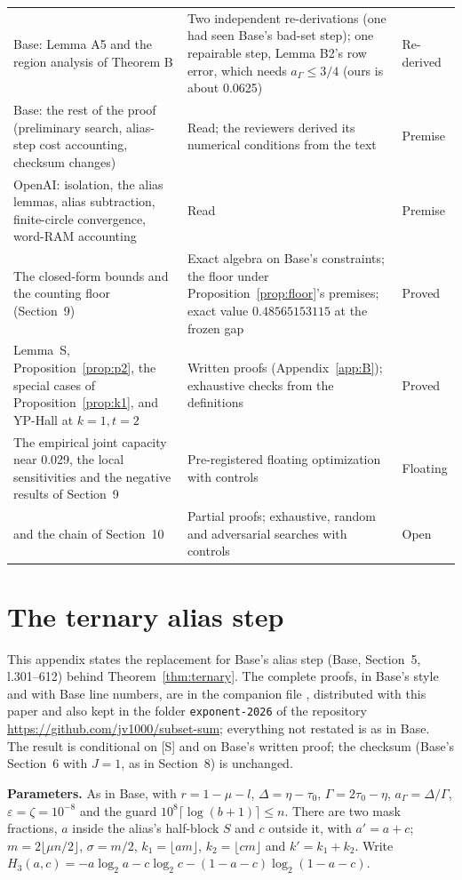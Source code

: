 \documentclass[11pt]{article}
\newcommand{\eps}{\varepsilon}
\theoremstyle{plain}
\begin{document}
{\begin{longtable}{@{}>{\raggedright\arraybackslash}p{4.2cm}>{\raggedright\arraybackslash}p{8.7cm}>{\raggedright\arraybackslash}p{2.6cm}@{}}
Base: Lemma A5 and the region analysis of Theorem B & Two independent re-derivations (one had seen Base's bad-set step); one repairable step, Lemma B2's row error, which needs $a_\Gamma \le 3/4$ (ours is about 0.0625) & Re-derived \\
Base: the rest of the proof (preliminary search, alias-step cost accounting, checksum changes) & Read; the reviewers derived its numerical conditions from the text & Premise \\
OpenAI: isolation, the alias lemmas, alias subtraction, finite-circle convergence, word-RAM accounting & Read & Premise \\
The closed-form bounds and the counting floor (Section~9) & Exact algebra on Base's constraints; the floor under Proposition~\ref{prop:floor}'s premises; exact value $0.48565153115$ at the frozen gap & Proved \\
Lemma~S, Proposition~\ref{prop:p2}, the special cases of Proposition~\ref{prop:k1}, and YP-Hall at $k=1,t=2$ & Written proofs (Appendix~\ref{app:B}); exhaustive checks from the definitions & Proved \\
The empirical joint capacity near 0.029, the local sensitivities and the negative results of Section~9 & Pre-registered floating optimization with controls & Floating \\
{[S]} and the chain of Section~10 & Partial proofs; exhaustive, random and adversarial searches with controls & Open \\
\end{longtable}
}

\appendix

\section{The ternary alias step}\label{app:T}

This appendix states the replacement for Base's alias step (Base, Section~5, l.301--612) behind Theorem~\ref{thm:ternary}. The complete proofs, in Base's style and with Base line numbers, are in the companion file , distributed with this paper and also kept in the folder \texttt{exponent-2026} of the repository \url{https://github.com/jv1000/subset-sum}; everything not restated is as in Base. The result is conditional on [S] and on Base's written proof; the checksum (Base's Section~6 with $J = 1$, as in Section~8) is unchanged.

\textbf{Parameters.} As in Base, with $r = 1 - \mu - l$, $\Delta = \eta - \tau_0$, $\Gamma = 2\tau_0 - \eta$, $a_\Gamma = \Delta/\Gamma$, $\eps = \zeta = 10^{-8}$ and the guard $10^8\lceil\log(b+1)\rceil \le n$. There are two mask fractions, $a$ inside the alias's half-block $S$ and $c$ outside it, with $a' = a + c$; $m = 2\lfloor \mu n/2 \rfloor$, $\sigma = m/2$, $k_1 = \lfloor am \rfloor$, $k_2 = \lfloor cm \rfloor$ and $k' = k_1 + k_2$. Write $H_3(a,c) = -a\log_2 a - c\log_2 c - (1-a-c)\log_2(1-a-c)$.
\end{document}
